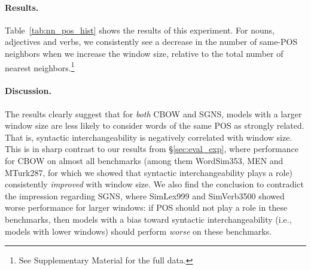 \documentclass[11pt,a4paper]{article}
\begin{document}
    \paragraph{Results.}
    
    Table~\ref{tab:nn_pos_hist} shows the results of this experiment.
    For nouns, adjectives and verbs, we consistently see a decrease in
    the  number of same-POS neighbors when we increase the window size,
    relative to the total number of nearest
    neighbors.\footnote{See Supplementary Material for the full data.}
    
    \paragraph{Discussion.}
    
    The results clearly suggest that for \textit{both} CBOW and SGNS,
    models with a larger window size are less likely to consider words
    of the same POS as strongly related.
    That is, syntactic interchangeability is negatively correlated with window size.
    This is in sharp contrast to our results from \S\ref{sec:eval_exp},
    where performance for CBOW on almost all benchmarks
    (among them  WordSim353, MEN and MTurk287, for which we showed that
    syntactic interchangeability plays a role) consistently
    \textit{improved} with window size.
    We also find the conclusion to contradict the impression regarding SGNS,
    where SimLex999 and SimVerb3500 showed worse performance for larger windows:
    if POS should not play a role in these benchmarks,
    then models with a bias toward syntactic interchangeability (i.e., models with lower windows)
    should perform \textit{worse} on these benchmarks.
    
\end{document}
